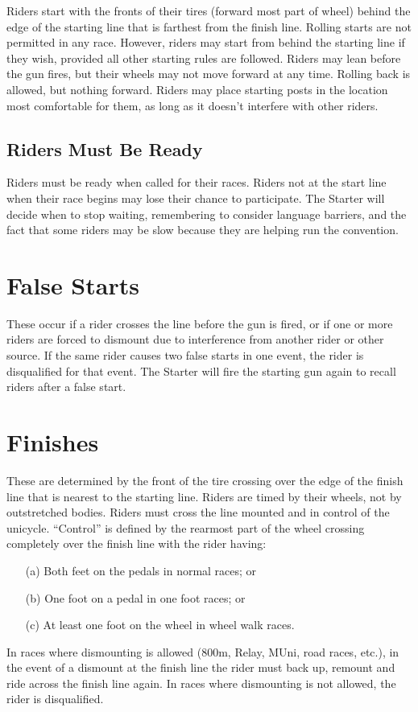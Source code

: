 Riders start with the fronts of their tires (forward most part of wheel) behind the edge of the starting line that is farthest from the finish line.
Rolling starts are not permitted in any race.
However, riders may start from behind the starting line if they wish, provided all other starting rules are followed.
Riders may lean before the gun fires, but their wheels may not move forward at any time.
Rolling back is allowed, but nothing forward.
Riders may place starting posts in the location most comfortable for them, as long as it doesn't interfere with other riders.

\subsection{Riders Must Be Ready}
Riders must be ready when called for their races.
Riders not at the start line when their race begins may lose their chance to participate.
The Starter will decide when to stop waiting, remembering to consider language barriers, and the fact that some riders may be slow because they are helping run the convention.

\section{False Starts}
These occur if a rider crosses the line before the gun is fired, or if one or more riders are forced to dismount due to interference from another rider or other source.
If the same rider causes two false starts in one event, the rider is disqualified for that event.
The Starter will fire the starting gun again to recall riders after a false start.

\section{Finishes \label{sec:racing_finishes}}
These are determined by the front of the tire crossing over the edge of the finish line that is nearest to the starting line.
Riders are timed by their wheels, not by outstretched bodies.
Riders must cross the line mounted and in control of the unicycle.
``Control'' is defined by the rearmost part of the wheel crossing completely over the finish line with the rider having: 
\begin{enumerate}
\item[(a)] Both feet on the pedals in normal races; or 
\item[(b)] One foot on a pedal in one foot races; or 
\item[(c)] At least one foot on the wheel in wheel walk races.
\end{enumerate}
In races where dismounting is allowed (800m, Relay, MUni, road races, etc.), in the event of a dismount at the finish line the rider must back up, remount and ride across the finish line again.
In races where dismounting is not allowed, the rider is disqualified.

